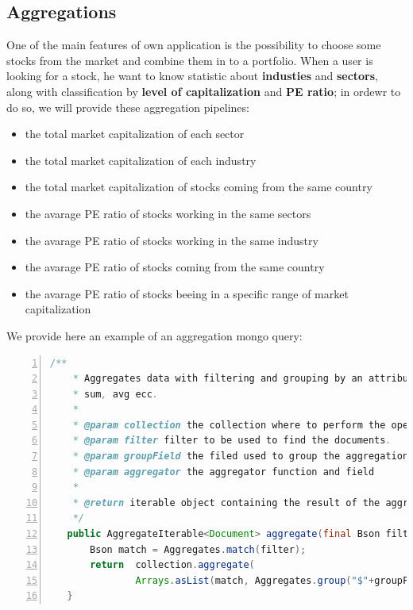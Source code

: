 \subsection{Aggregations}
One of the main features of own application is the possibility to choose some stocks from
the market and combine them in to a portfolio. When a user is looking for a stock, he want to
know statistic about \textbf{industies} and \textbf{sectors}, along with classification by 
\textbf{level of capitalization} and  \textbf{PE ratio}; in ordewr to do so, we will provide
these aggregation pipelines:
\begin{itemize}
    \item the total market capitalization of each sector
    \item the total market capitalization of each industry
    \item the total market capitalization of stocks coming from the same country
    \item the avarage PE ratio of stocks working in the same sectors
    \item the avarage PE ratio of stocks working in the same industry
    \item the avarage PE ratio of stocks coming from the same country
    \item the avarage PE ratio of stocks beeing in a specific range of market capitalization
\end{itemize}
We provide here an example of an aggregation mongo query:
\begin{lstlisting}[basicstyle=\footnotesize,language=Java,numbers=left,
    numberstyle=\footnotesize,numbersep=4pt,frame=single]
    /**
    * Aggregates data with filtering and grouping by an attribute, can compute
    * sum, avg ecc.
    *
    * @param collection the collection where to perform the operation;
    * @param filter filter to be used to find the documents.
    * @param groupField the filed used to group the aggregation
    * @param aggregator the aggregator function and field
    *
    * @return iterable object containing the result of the aggregation.
    */
   public AggregateIterable<Document> aggregate(final Bson filter, final String groupField, final BsonField aggregator, final MongoCollection<Document> collection) {
       Bson match = Aggregates.match(filter);
       return  collection.aggregate(
               Arrays.asList(match, Aggregates.group("$"+groupField, aggregator)));
   }
\end{lstlisting}

